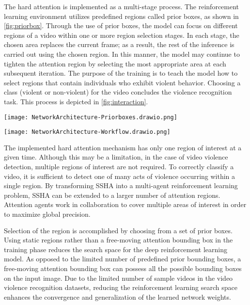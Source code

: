 \documentclass[review]{elsarticle}
\begin{document}
{The hard attention is implemented as a multi-stage process. The reinforcement learning environment utilizes predefined regions called prior boxes, as shown in} \autoref{fig:priorbox}{. Through the use of prior boxes, the model can focus on different regions of a video within one or more region selection stages. In each stage, the chosen area replaces the current frame; as a result, the rest of the inference is carried out using the chosen region. In this manner, the model may continue to tighten the attention region by selecting the most appropriate area at each subsequent iteration. The purpose of the training is to teach the model how to select regions that contain individuals who exhibit violent behavior. Choosing a class (violent or non-violent) for the video concludes the violence recognition task. This process is depicted in} \autoref{fig:interaction}.

\begin{figure*}[!htbp]
    \centering
    \texttt{[image: NetworkArchitecture-Priorboxes.drawio.png]}
    \caption{Prior boxes defined on the input frame.}
    \label{fig:priorbox}
\end{figure*}

\begin{figure*}[!htbp]
    \centering
    \texttt{[image: NetworkArchitecture-Workflow.drawio.png]}
    \caption{Model interaction with an input video.}
    \label{fig:interaction}
\end{figure*}




The implemented hard attention mechanism has only one region of interest at a given time. Although this may be a limitation, in the case of video violence detection, multiple regions of interest are not required. To correctly classify a video, it is sufficient to detect one of many acts of violence occurring within a single region. By transforming SSHA into a multi-agent reinforcement learning problem, SSHA can be extended to a larger number of attention regions. Attention agents work in collaboration to cover multiple areas of interest in order to maximize global precision.

Selection of the region is accomplished by choosing from a set of prior boxes. Using static regions rather than a free-moving attention bounding box in the training phase reduces the search space for the deep reinforcement learning model. As opposed to the limited number of predefined prior bounding boxes, a free-moving attention bounding box can possess all the possible bounding boxes on the input image. Due to the limited number of sample videos in the video violence recognition datasets, reducing the reinforcement learning search space enhances the convergence and generalization of the learned network weights.
\end{document}
